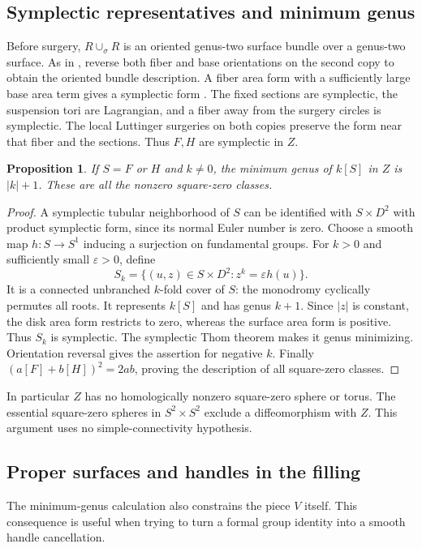 \documentclass[11pt]{amsart}
\newtheorem{proposition}[theorem]{Proposition}
\theoremstyle{definition}
\theoremstyle{remark}
\begin{document}
\subsection{Symplectic representatives and minimum genus}
Before surgery, $R\cup_\sigma R$ is an oriented genus-two surface
bundle over a genus-two surface. As in
\cite[Theorem 8 and footnote 3]{LP25}, reverse both fiber and base
orientations on the second copy to obtain the oriented bundle
description. A fiber area form with a sufficiently large base area
term gives a symplectic form \cite{Thu76}. The fixed sections are
symplectic, the suspension tori are Lagrangian, and a fiber away from
the surgery circles is symplectic. The local Luttinger surgeries on
both copies preserve the form near that fiber and the sections.
Thus $F,H$ are symplectic in $Z$.

\begin{proposition}\label{prop:genus}
If $S=F$ or $H$ and $k\ne0$, the minimum genus of $k[S]$ in $Z$
is $|k|+1$. These are all the nonzero square-zero classes.
\end{proposition}
\begin{proof}
A symplectic tubular neighborhood of $S$ can be identified with
$S\times D^2$ with product symplectic form, since its normal Euler
number is zero. Choose a smooth map $h:S\to S^1$ inducing a
surjection on fundamental groups. For $k>0$ and sufficiently small
$\varepsilon>0$, define
\[
 S_k=\{(u,z)\in S\times D^2:z^k=\varepsilon h(u)\}.
\]
It is a connected unbranched $k$-fold cover of $S$: the monodromy
cyclically permutes all roots. It represents $k[S]$ and has genus
$k+1$. Since $|z|$ is constant, the disk area form restricts to zero,
whereas the surface area form is positive. Thus $S_k$ is symplectic.
The symplectic Thom theorem \cite[Theorem 1.1]{OS00} makes it genus
minimizing. Orientation reversal gives the assertion for negative
$k$. Finally $(a[F]+b[H])^2=2ab$, proving the description of all
square-zero classes.
\end{proof}

In particular $Z$ has no homologically nonzero square-zero sphere or
torus. The essential square-zero spheres in $S^2\times S^2$ exclude
a diffeomorphism with $Z$. This argument uses no simple-connectivity
hypothesis.

\subsection{Proper surfaces and handles in the filling}
The minimum-genus calculation also constrains the piece $V$ itself.
This consequence is useful when trying to turn a formal group identity
into a smooth handle cancellation.
\end{document}
